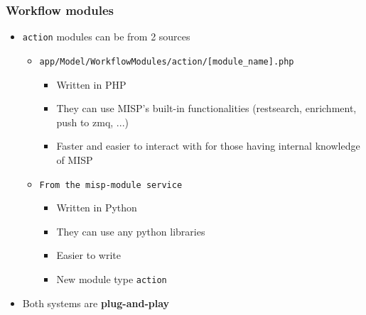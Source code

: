 \begin{frame}
    \frametitle{Workflow modules}
    \begin{itemize}
        \item \texttt{action} modules can be from 2 sources
        \begin{itemize}
            \item \texttt{\scriptsize app/Model/WorkflowModules/action/[module\_name].php}
            \begin{itemize}
                \item Written in PHP
                \item They can use MISP's built-in functionalities (restsearch, enrichment, push to zmq, ...)
                \item Faster and easier to interact with for those having internal knowledge of MISP
            \end{itemize}
            \item \texttt{From the misp-module service} 
            \begin{itemize}
                \item Written in Python
                \item They can use any python libraries
                \item Easier to write
                \item New module type \texttt{action}
            \end{itemize}
        \end{itemize}
        \item Both systems are \textbf{plug-and-play}
    \end{itemize}
\end{frame}

